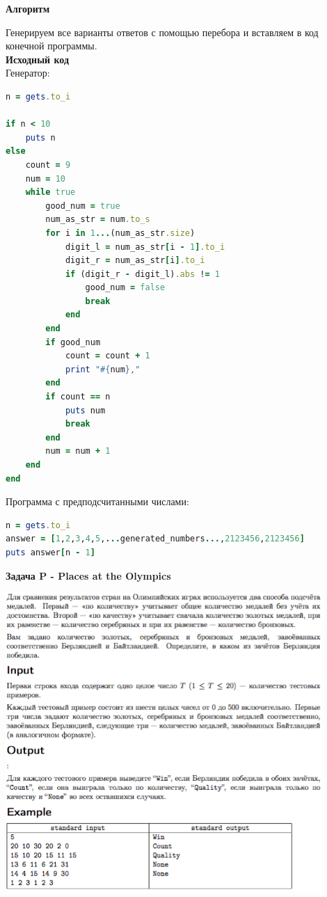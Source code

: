 \documentclass[a4paper,12pt]{article}
\begin{document}
\textbf{{\large Алгоритм}}

Генерируем все варианты ответов с помощью перебора и вставляем в код конечной программы. \\
\newpage
\textbf{{\large Исходный код}} \\
Генератор:
\begin{lstlisting}[language=Ruby]
n = gets.to_i

if n < 10
    puts n
else
    count = 9
    num = 10
    while true
        good_num = true
        num_as_str = num.to_s
        for i in 1...(num_as_str.size)
            digit_l = num_as_str[i - 1].to_i
            digit_r = num_as_str[i].to_i
            if (digit_r - digit_l).abs != 1
                good_num = false
                break
            end
        end
        if good_num
            count = count + 1
            print "#{num},"
        end
        if count == n
            puts num
            break
        end
        num = num + 1
    end
end
\end{lstlisting}
Программа с предподсчитанными числами:
\begin{lstlisting}[language=Ruby]
n = gets.to_i
answer = [1,2,3,4,5,...generated_numbers...,2123456,2123456]
puts answer[n - 1]
\end{lstlisting}


\newpage
\textbf{{\large Задача P - Places at the Olympics}}

\begin{center}
\includegraphics[width=0.9\textwidth]{OC_Bashkortostan/P.png}\\ [1cm]
\end{center}
\end{document}
